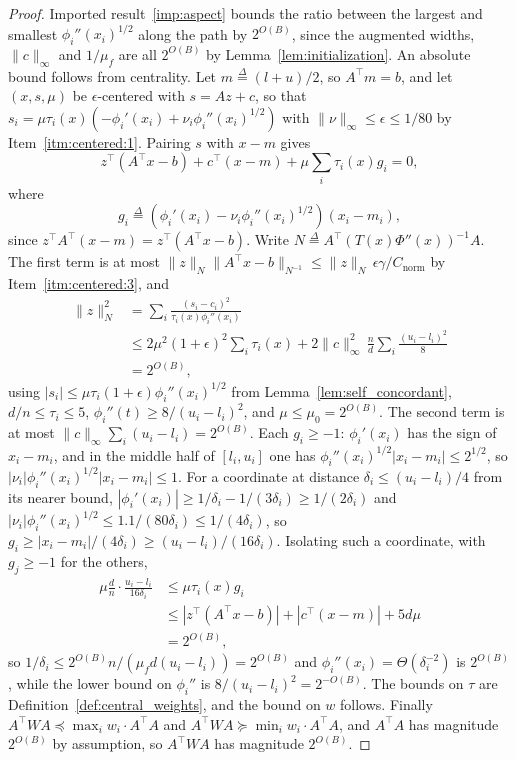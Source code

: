 \documentclass[11pt]{article}
\newcommand{\defeq}{\stackrel{\Delta}{=}}
\newcommand{\Cnorm}{C_{\mathrm{norm}}}
\begin{document}
\begin{proof}
Imported result~\ref{imp:aspect} bounds the ratio between the largest and
smallest $\phi_i''(x_i)^{1/2}$ along the path by
$2^{O(B)}$, since the augmented widths,
$\|c\|_{\infty}$ and
$1 / \mu_f$ are all
$2^{O(B)}$ by Lemma~\ref{lem:initialization}.
An absolute bound follows from centrality.
Let $m \defeq (l + u) / 2$, so
$A^\top m = b$, and let
$(x, s, \mu)$ be
$\epsilon$-centered with
$s = A z + c$, so that
$s_i = \mu \tau_i(x) ( - \phi_i'(x_i) + \nu_i \phi_i''(x_i)^{1/2} )$ with
$\|\nu\|_{\infty} \le \epsilon \le 1/80$ by Item~\ref{itm:centered:1}.
Pairing $s$ with
$x - m$ gives
\[
z^\top \left( A^\top x - b \right)
+ c^\top \left( x - m \right)
+ \mu \sum_i \tau_i(x) g_i
=
0 ,
\]
where
\[
g_i
\defeq
\left( \phi_i'(x_i)
- \nu_i \phi_i''(x_i)^{1/2} \right)
\left( x_i - m_i \right) ,
\]
since $z^\top A^\top (x - m) = z^\top (A^\top x - b)$.
Write $N \defeq A^\top (T(x) \Phi''(x))^{-1} A$.
The first term is at most
$\|z\|_{N} \|A^\top x - b\|_{N^{-1}} \le \|z\|_{N} \, \epsilon \gamma / \Cnorm$
by Item~\ref{itm:centered:3}, and
\[
\begin{aligned}
\|z\|_{N}^{2}
&=
\sum_i \frac{(s_i - c_i)^{2}}{\tau_i(x) \phi_i''(x_i)}
\\
&\le
2 \mu^{2} (1 + \epsilon)^{2} \sum_i \tau_i(x)
+ 2 \|c\|_{\infty}^{2} \, \frac{n}{d} \sum_i \frac{(u_i - l_i)^{2}}{8}
\\
&=
2^{O(B)} ,
\end{aligned}
\]
using $|s_i| \le \mu \tau_i (1 + \epsilon) \phi_i''(x_i)^{1/2}$ from
Lemma~\ref{lem:self_concordant}, $d / n \le \tau_i \le 5$,
$\phi_i''(t) \ge 8 / (u_i - l_i)^{2}$, and
$\mu \le \mu_0 = 2^{O(B)}$.
The second term is at most $\|c\|_{\infty} \sum_i (u_i - l_i) = 2^{O(B)}$.
Each $g_i \ge -1$:
$\phi_i'(x_i)$ has the sign of
$x_i - m_i$, and in the middle half of
$[l_i, u_i]$ one has
$\phi_i''(x_i)^{1/2} |x_i - m_i| \le 2^{1/2}$, so
$|\nu_i| \phi_i''(x_i)^{1/2} |x_i - m_i| \le 1$.
For a coordinate at distance $\delta_i \le (u_i - l_i) / 4$ from its nearer
bound, $|\phi_i'(x_i)| \ge 1 / \delta_i - 1 / (3 \delta_i) \ge 1 / (2 \delta_i)$
and $|\nu_i| \phi_i''(x_i)^{1/2} \le 1.1 / (80 \delta_i) \le 1 / (4 \delta_i)$,
so $g_i \ge |x_i - m_i| / (4 \delta_i) \ge (u_i - l_i) / (16 \delta_i)$.
Isolating such a coordinate, with $g_j \ge -1$ for the others,
\[
\begin{aligned}
\mu \frac{d}{n} \cdot \frac{u_i - l_i}{16 \delta_i}
&\le
\mu \tau_i(x) g_i
\\
&\le
\left| z^\top (A^\top x - b) \right|
+ \left| c^\top (x - m) \right|
+ 5 d \mu
\\
&=
2^{O(B)} ,
\end{aligned}
\]
so $1 / \delta_i \le 2^{O(B)} n / (\mu_f d (u_i - l_i)) = 2^{O(B)}$ and
$\phi_i''(x_i) = \Theta(\delta_i^{-2})$ is
$2^{O(B)}$, while the lower bound on
$\phi_i''$ is
$8 / (u_i - l_i)^{2} = 2^{-O(B)}$.
The bounds on $\tau$ are Definition~\ref{def:central_weights}, and the bound on
$w$ follows.
Finally $A^\top W A \preceq \max_i w_i \cdot A^\top A$ and
$A^\top W A \succeq \min_i w_i \cdot A^\top A$, and
$A^\top A$ has magnitude
$2^{O(B)}$ by assumption, so
$A^\top W A$ has magnitude
$2^{O(B)}$.
\end{proof}
\end{document}
